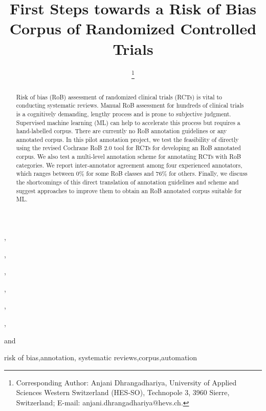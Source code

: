 \documentclass{IOS-Book-Article}
\def\hb{\hbox to 11.5 cm{}}
\begin{document}
\pagestyle{headings}
\def\thepage{}
\begin{frontmatter}              %


\title{First Steps towards a Risk of Bias Corpus of Randomized Controlled Trials}

\markboth{}{April 2022\hb}

\author[A,B]{ %
\thanks{Corresponding Author: Anjani Dhrangadhariya, University of Applied Sciences Western Switzerland (HES-SO), Technopole 3,
3960 Sierre, Switzerland; E-mail:
anjani.dhrangadhariya@hevs.ch.}},
\author[C,D]{ }
,
\author[C,D]{ }
,
\author[C,D]{ }
,
\author[C,D]{ }
,
\author[C,D]{ }
,
\author[E,F]{ }
and
\author[A,B]{ }

\address[A]{Informatics Institute, HES-SO Valais-Wallis, Sierre, Switzerland}
\address[B]{University of Geneva (UNIGE), Geneva, Switzerland}
\address[C]{School of Health Sciences, HES-SO Valais-Wallis, Leukerbad, Switzerland.}
\address[D]{Department of Physiotherapy, HES-SO Valais-Wallis, Leukerbad, Switzerland.}
\address[E]{Geneva School of Business Administration, HES-SO Geneva, Switzerland.}
\address[F]{SIB Swiss Institute of Bioinformatics (SIB), Geneva, Switzerland}

\begin{abstract}
Risk of bias (RoB) assessment of randomized clinical trials (RCTs) is vital to conducting systematic reviews. 
Manual RoB assessment for hundreds of clinical trials is a cognitively demanding, lengthy process and is prone to subjective judgment. 
Supervised machine learning (ML) can help to accelerate this process but requires a hand-labelled corpus.
There are currently no RoB annotation guidelines or any annotated corpus.
In this pilot annotation project, we test the feasibility of directly using the revised Cochrane RoB 2.0 tool for RCTs for developing an RoB annotated corpus. 
We also test a multi-level annotation scheme for annotating RCTs with RoB categories.
We report inter-annotator agreement among four experienced annotators, which ranges between 0\% for some RoB classes and 76\% for others.
Finally, we discuss the shortcomings of this direct translation of annotation guidelines and scheme and suggest approaches to improve them to obtain an RoB annotated corpus suitable for ML.
\end{abstract}

\begin{keyword}
risk of bias\sep annotation\sep
systematic reviews\sep corpus\sep automation
\end{keyword}
\end{frontmatter}
\markboth{April 2022\hb}{April 2022\hb}
%
%
%
\end{document}
